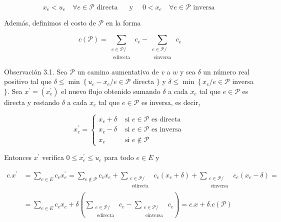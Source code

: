 \documentclass[10pt]{article}
\begin{document}
$$
x_{e}<u_{e} \quad \forall e \in \mathcal{P} \text { directa } \quad \text { y } \quad 0<x_{e} \quad \forall e \in \mathcal{P} \text { inversa }
$$

Además, definimos el costo de $\mathcal{P}$ en la forma

$$
c(\mathcal{P})=\sum_{\substack{e \in \mathcal{P} / \\ \text { edirecta }}} c_{e}-\sum_{\substack{e \in \mathcal{P} / \\ \text { einversa }}} c_{e}
$$

Observación 3.1. Sea $\mathcal{P}$ un camino aumentativo de $v$ a $w$ y sea $\delta$ un número real positivo tal que $\delta \leq \min \left\{u_{e}-x_{e} / e \in \mathcal{P}\right.$ directa $\}$ y $\delta \leq \min \left\{x_{e} / e \in \mathcal{P}\right.$ inversa $\}$. Sea $x^{\prime}=\left(x_{e}^{\prime}\right)$ el nuevo flujo obtenido sumando $\delta$ a cada $x_{e}$ tal que $e \in \mathcal{P}$ es directa y restando $\delta$ a cada $x_{e}$ tal que $e \in \mathcal{P}$ es inversa, es decir,

$$
x_{e}^{\prime}= \begin{cases}x_{e}+\delta & \text { si } e \in \mathcal{P} \text { es directa } \\ x_{e}-\delta & \text { si } e \in \mathcal{P} \text { es inversa } \\ x_{e} & \text { si } e \notin \mathcal{P}\end{cases}
$$

Entonces $x^{\prime}$ verifica $0 \leq x_{e}^{\prime} \leq u_{e}$ para todo $e \in E$ y

$$
\begin{aligned}
c . x^{\prime} & =\sum_{e \in E} c_{e} x_{e}^{\prime}=\sum_{e \notin \mathcal{P}} c_{e} x_{e}+\sum_{\substack{e \in \mathcal{P} / \\
\text { edirecta }}} c_{e}\left(x_{e}+\delta\right)+\sum_{\substack{e \in \mathcal{P} / \\
\text { einversa }}} c_{e}\left(x_{e}-\delta\right)= \\
& =\sum_{e \in E} c_{e} x_{e}+\delta\left(\sum_{\substack{e \in \mathcal{P} / \\
\text { edirecta }}} c_{e}-\sum_{\substack{e \in \mathcal{P} / \\
\text { einversa }}} c_{e}\right)=c . x+\delta . c(\mathcal{P})
\end{aligned}
$$
\end{document}
